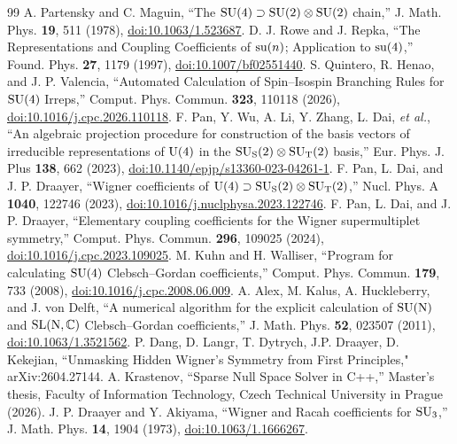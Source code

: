 \documentclass[aps,onecolumn,10pt,superscriptaddress,floatfix,nofootinbib]{revtex4}
\begin{document}
\begin{thebibliography}{99}
 A. Partensky and C. Maguin, ``The $\rm SU(4) \supset SU(2) \otimes SU(2)$ chain,'' J. Math. Phys. \textbf{19}, 511 (1978), \href{https://doi.org/10.1063/1.523687}{doi:10.1063/1.523687}.
 D. J. Rowe and J. Repka, ``The Representations and Coupling Coefficients of ${\rm su}(n)$; Application to $\rm su(4)$,'' Found. Phys. \textbf{27}, 1179 (1997), \href{https://doi.org/10.1007/bf02551440}{doi:10.1007/bf02551440}.
 S. Quintero, R. Henao, and J. P. Valencia, ``Automated Calculation of Spin--Isospin Branching Rules for $\rm SU(4)$ Irreps,'' Comput. Phys. Commun. \textbf{323}, 110118 (2026), \href{https://doi.org/10.1016/j.cpc.2026.110118}{doi:10.1016/j.cpc.2026.110118}.
 F. Pan, Y. Wu, A. Li, Y. Zhang, L. Dai, \textit{et al.}, ``An algebraic projection procedure for construction of the basis vectors of irreducible representations of $\rm U(4)$ in the $\rm SU_S(2) \otimes SU_T(2)$ basis,'' Eur. Phys. J. Plus \textbf{138}, 662 (2023), \href{https://doi.org/10.1140/epjp/s13360-023-04261-1}{doi:10.1140/epjp/s13360-023-04261-1}.
 F. Pan, L. Dai, and J. P. Draayer, ``Wigner coefficients of $\rm U(4) \supset SU_S(2) \otimes SU_T(2)$,'' Nucl. Phys. A \textbf{1040}, 122746 (2023), \href{https://doi.org/10.1016/j.nuclphysa.2023.122746}{doi:10.1016/j.nuclphysa.2023.122746}.
 F. Pan, L. Dai, and J. P. Draayer, ``Elementary coupling coefficients for the Wigner supermultiplet symmetry,'' Comput. Phys. Commun. \textbf{296}, 109025 (2024), \href{https://doi.org/10.1016/j.cpc.2023.109025}{doi:10.1016/j.cpc.2023.109025}.
 M. Kuhn and H. Walliser, ``Program for calculating $\rm SU(4)$ Clebsch--Gordan coefficients,'' Comput. Phys. Commun. \textbf{179}, 733 (2008), \href{https://doi.org/10.1016/j.cpc.2008.06.009}{doi:10.1016/j.cpc.2008.06.009}.
 A. Alex, M. Kalus, A. Huckleberry, and J. von Delft, ``A numerical algorithm for the explicit calculation of $\rm SU(N)$ and $\rm SL(N,\mathbb{C})$ Clebsch--Gordan coefficients,'' J. Math. Phys. \textbf{52}, 023507 (2011), \href{https://doi.org/10.1063/1.3521562}{doi:10.1063/1.3521562}.
 P. Dang, D. Langr, T. Dytrych, J.P. Draayer, D. Kekejian, ``Unmasking Hidden Wigner’s Symmetry from First Principles," arXiv:2604.27144.
 A. Krastenov, ``Sparse Null Space Solver in C++,'' Master's thesis, Faculty of Information Technology, Czech Technical University in Prague (2026).
 J. P. Draayer and Y. Akiyama, ``Wigner and Racah coefficients for $\rm SU_3$,'' J. Math. Phys. \textbf{14}, 1904 (1973), \href{https://doi.org/10.1063/1.1666267}{doi:10.1063/1.1666267}.

\end{thebibliography}
\end{document}
